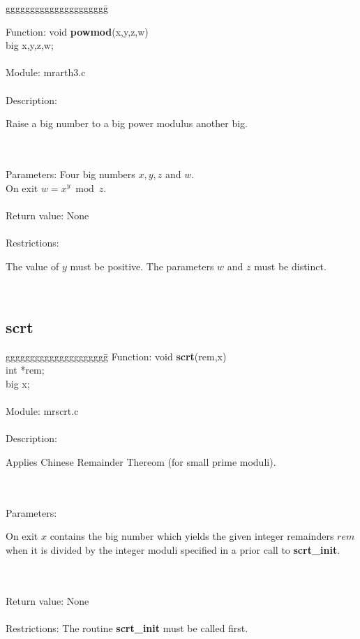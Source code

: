 \begin{tabbing}
ggggggggggggggggggggg\= \kill


      Function:      \>void {\bf powmod}(x,y,z,w) \\
                     \>big x,y,z,w; \\
      \ \\
      Module:        \>mrarth3.c \\
      \ \\
      Description:   \>
                     \parbox[t]{3 in}
                     {Raise a big number to a big power modulus another 
                      big.} \\
      \ \\
      Parameters:    \>Four big numbers $x, y, z$ and $w$. \\
                     \>On exit $w=x^y \bmod z$. \\
      \ \\
      Return value:  \>None \\
      \ \\
      Restrictions:  \>
                     \parbox[t]{3in}
                     {The value of $y$ must be positive. The parameters $w$    
                      and $z$ must be distinct.} \\


\end{tabbing}

\subsection{scrt}
\begin{tabbing}
ggggggggggggggggggggg\= \kill
      Function:      \>void {\bf scrt}(rem,x) \\
                     \>int *rem; \\
                     \>big x; \\
      \ \\
      Module:        \>mrscrt.c \\
      \ \\
      Description:   \>
                     \parbox[t]{3 in}
                     {Applies Chinese Remainder Thereom (for small 
                      prime moduli).} \\
      \ \\
      Parameters:    \>
                     \parbox[t]{3 in}
                     {On exit $x$ contains the big number which yields 
                     the given integer remainders $rem$ when it is divided by 
                     the integer moduli
                     specified in a prior call to {\bf scrt\_init}.} \\
      \ \\
      Return value:  \>None \\
      \ \\
      Restrictions:  \>The routine {\bf scrt\_init} must be called first. \\
\end{tabbing}

